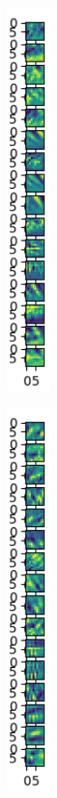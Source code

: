 \documentclass[12pt]{article}
\begin{document}
\begin{figure}[h]
{\begin{subfigure}{1.3cm}
						\captionsetup{justification=centering,margin=.8cm}
					\end{subfigure}			
					\begin{subfigure}{1.3cm}
						\centering
						\includegraphics[width=1.3cm]{../Images/Feature_Maps_Cropped/image_2.png}
						\captionsetup{justification=centering,margin=1cm}
					\end{subfigure}
					\begin{subfigure}{1.3cm}
						\centering
						\includegraphics[width=1.3cm]{../Images/Feature_Maps_Cropped/image_3.png}

\end{subfigure}}
\end{figure}
\end{document}
